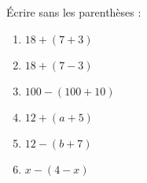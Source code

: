 
\begin{exercice}\label{exo2smath-0104}

    Écrire sans les parenthèses :
    \begin{multicols}{2}
    \begin{enumerate}
        \item
            \( 18+(7+3)\)
        \item
            \( 18+(7-3)\)
        \item
            \( 100-(100+10)\)
        \item
            \( 12+(a+5)\)
        \item
            \( 12-(b+7)\)
        \item
            \( x-(4-x)\)
    \end{enumerate}
    \end{multicols}

\end{exercice}

